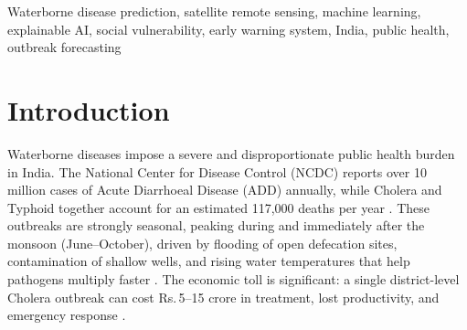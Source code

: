 \documentclass[conference]{IEEEtran}
\begin{document}
\begin{abstract}
Every year, waterborne diseases like Diarrhoea, Cholera, and Typhoid
claim thousands of lives across India---yet health authorities often
learn about outbreaks only weeks after they begin, leaving little time
to act. This paper introduces \textbf{JalDrishti} (meaning \emph{water
vision}), a free, open-source early warning system that uses satellite
imagery to predict disease outbreaks up to four weeks before they occur,
giving health workers a critical head start.

JalDrishti reads water quality signals from freely available satellites
and combines them with local social factors---such as sanitation access,
poverty levels, and healthcare availability---to assess outbreak risk
across 80 Indian districts. A machine learning model then learns from
five years of historical outbreak data to identify which conditions
reliably precede an outbreak. The system also explains its predictions
in plain terms, showing health officers exactly which water or social
factors are driving the risk in their district.

In testing, the system correctly identified outbreaks with strong
accuracy across all three diseases, outperforming simpler approaches.
A key discovery was that a rise in algal blooms in water bodies, visible
from satellites, tends to signal a Cholera outbreak about a month later---
a pattern that could serve as a simple, low-cost alert trigger on its own.
Because JalDrishti runs entirely on free tools and public data, any
state health department can deploy it without special infrastructure or
budget. It is designed to be practical, transparent, and immediately
useful for the districts that need it most.
\end{abstract}

\begin{IEEEkeywords}
Waterborne disease prediction, satellite remote sensing, machine learning,
explainable AI, social vulnerability, early warning system, India,
public health, outbreak forecasting
\end{IEEEkeywords}

\section{Introduction}

Waterborne diseases impose a severe and disproportionate public health
burden in India. The National Center for Disease Control (NCDC) reports
over 10 million cases of Acute Diarrhoeal Disease (ADD) annually, while
Cholera and Typhoid together account for an estimated 117,000 deaths per
year \cite{epiclim2025,idsp2025}. These outbreaks are strongly seasonal,
peaking during and immediately after the monsoon (June--October), driven
by flooding of open defecation sites, contamination of shallow wells, and
rising water temperatures that help pathogens multiply faster
\cite{campbell2020,nusrat2024}. The economic toll is significant: a
single district-level Cholera outbreak can cost Rs.\,5--15 crore in
treatment, lost productivity, and emergency response \cite{mukherjee2022}.
\end{document}

